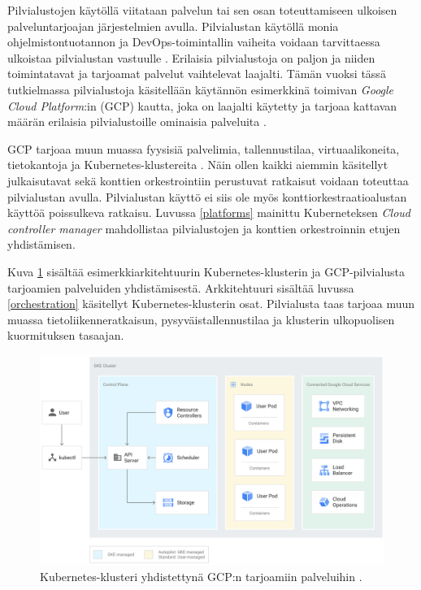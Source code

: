 Pilvialustojen käytöllä viitataan palvelun tai sen osan toteuttamiseen ulkoisen palveluntarjoajan järjestelmien avulla.
Pilvialustan käytöllä monia ohjelmistontuotannon ja DevOps-toimintallin vaiheita voidaan tarvittaessa ulkoistaa pilvialustan vastuulle \cite{tomarchio20}.
Erilaisia pilvialustoja on paljon ja niiden toimintatavat ja tarjoamat palvelut vaihtelevat laajalti.
Tämän vuoksi tässä tutkielmassa pilvialustoja käsitellään käytännön esimerkkinä toimivan \textit{Google Cloud Platform}:in (GCP) kautta, joka on laajalti käytetty ja tarjoaa kattavan määrän erilaisia pilvialustoille ominaisia palveluita \cite{ahuja20}.

GCP tarjoaa muun muassa fyysisiä palvelimia, tallennustilaa, virtuaalikoneita, tietokantoja ja Kubernetes-klustereita \cite{Products23}.
Näin ollen kaikki aiemmin käsitellyt julkaisutavat sekä konttien orkestrointiin perustuvat ratkaisut voidaan toteuttaa pilvialustan avulla.
Pilvialustan käyttö ei siis ole myös konttiorkestraatioalustan käyttöä poissulkeva ratkaisu.
Luvussa \ref{platforms} mainittu Kuberneteksen \textit{Cloud controller manager} mahdollistaa pilvialustojen ja konttien orkestroinnin etujen yhdistämisen.

Kuva \ref{fig:architecture} sisältää esimerkkiarkitehtuurin Kubernetes-klusterin ja GCP-pilvialusta tarjoamien palveluiden yhdistämisestä.
Arkkitehtuuri sisältää luvussa \ref{orchestration} käsitellyt Kubernetes-klusterin osat.
Pilvialusta taas tarjoaa muun muassa tietoliikenneratkaisun, pysyväistallennustilaa ja klusterin ulkopuolisen kuormituksen tasaajan.


\begin{figure}[ht]
\begin{center}
\includegraphics[width=1\textwidth]{figures/gke_architecture.png}
\caption{Kubernetes-klusteri yhdistettynä GCP:n tarjoamiin palveluihin \cite{cluster23}\label{fig:architecture}.}
\end{center}
\end{figure}

